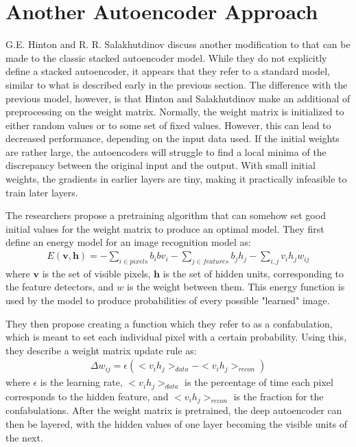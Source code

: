 \documentclass{article}
\newcommand{\vect}[1]{\mathbf{#1}}
\newcommand{\vh}[0]{\vect{h}}
\newcommand{\vv}[0]{\vect{v}}
\begin{document}
\section{Another Autoencoder Approach} 

G.E. Hinton and R. R. Salakhutdinov discuss another modification to that can be made to the classic stacked autoencoder model. While they do not explicitly define a stacked autoencoder, it appears that they refer to a standard  model, similar to what is described early in the previous section. The difference with the previous model, however, is that  Hinton and Salakhutdinov make an additional of preprocessing on the weight matrix. Normally, the weight matrix is initialized to either random values or to some set of fixed values. However, this can lead to decreased performance, depending on the input data used. If the initial weights are rather large, the autoencoders will struggle to find a local minima of the discrepancy between the original input and the output. With small initial weights, the gradients in earlier layers are tiny, making it practically infeasible to train later layers. 

The researchers propose a pretraining algorithm that can somehow set good initial values for the weight matrix to produce an optimal model. They first define an energy model for an image recognition model as:
\begin{align*}
E(\vv, \vh) = - \sum_{i \in pixels} b_i bv_i - \sum_{j \in features} b_j h_j - \sum_{i, j} v_i h_j w_{ij}
\end{align*}
where $\vv$ is the set of visible pixels, $\vh$ is the set of hidden units, corresponding to the feature detectors, and $w$ is the weight between them. This energy function is used by the model to produce probabilities of every possible "learned" image. 

They then propose creating a function which they refer to as a confabulation, which is meant to set each individual pixel with a certain probability. Using this, they describe a weight matrix update rule as:
\begin{align*}
\Delta w_{ij} = \epsilon (<v_i h_j>_{data} - <v_i h_j>_{recon})
\end{align*}
where $\epsilon$ is the learning rate, $<v_i h_j>_{data}$ is the percentage of time each pixel corresponds to the hidden feature, and $<v_i h_j>_{recon}$ is the fraction for the confabulations. After the weight matrix is pretrained, the deep autoencoder can then be layered, with the hidden values of one layer becoming the visible units of the next.
\end{document}
